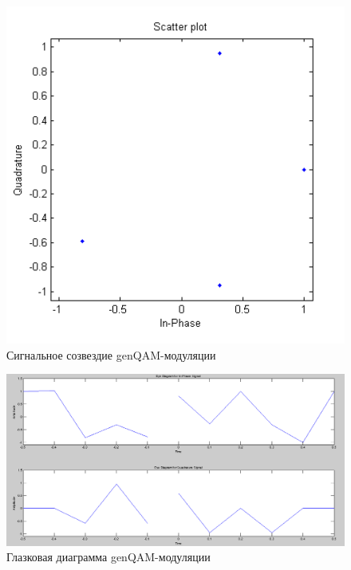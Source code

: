 \begin{figure}[H]
\includegraphics[width=150mm, scale = 0.9]{lab9/9_13}
   \caption{Сигнальное созвездие genQAM-модуляции}
\end{figure}



\begin{figure}[H]
\includegraphics[width=150mm, scale = 0.9]{lab9/9_14}
   \caption{Глазковая диаграмма genQAM-модуляции}
\end{figure}



